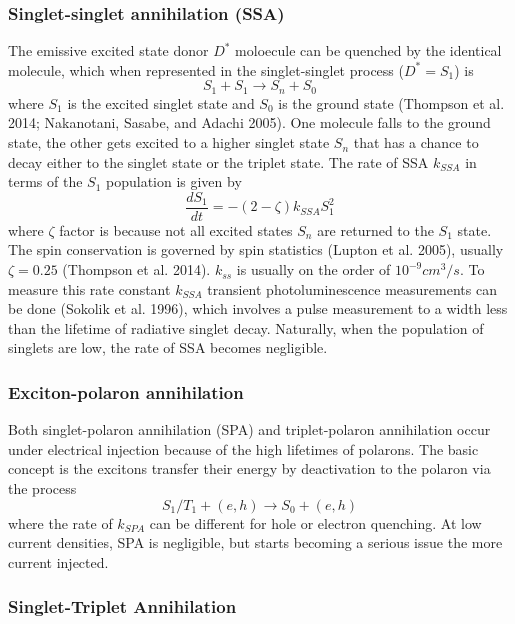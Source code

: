 \documentclass[
  letterpaper,
  DIV=11,
  numbers=noendperiod,
  oneside]{scrreprt}
\begin{document}
\hypertarget{singlet-singlet-annihilation-ssa}{%
\subsubsection{Singlet-singlet annihilation
(SSA)}\label{singlet-singlet-annihilation-ssa}}

The emissive excited state donor \(D^*\) moloecule can be quenched by
the identical molecule, which when represented in the singlet-singlet
process (\(D^*=S_1\)) is \[S_1 + S_1 \rightarrow S_n + S_0\] where
\(S_1\) is the excited singlet state and \(S_0\) is the ground state
(Thompson et al. 2014; Nakanotani, Sasabe, and Adachi 2005). One
molecule falls to the ground state, the other gets excited to a higher
singlet state \(S_n\) that has a chance to decay either to the singlet
state or the triplet state. The rate of SSA \(k_{SSA}\) in terms of the
\(S_1\) population is given by
\[\frac{dS_1}{dt} = -(2-\zeta)k_{SSA}S_1^2\] where \(\zeta\) factor is
because not all excited states \(S_n\) are returned to the \(S_1\)
state. The spin conservation is governed by spin statistics (Lupton et
al. 2005), usually \(\zeta=0.25\) (Thompson et al. 2014). \(k_{ss}\) is
usually on the order of \(10^{-9} cm^3/s\). To measure this rate
constant \(k_{SSA}\) transient photoluminescence measurements can be
done (Sokolik et al. 1996), which involves a pulse measurement to a
width less than the lifetime of radiative singlet decay. Naturally, when
the population of singlets are low, the rate of SSA becomes negligible.

\hypertarget{exciton-polaron-annihilation}{%
\subsubsection{Exciton-polaron
annihilation}\label{exciton-polaron-annihilation}}

Both singlet-polaron annihilation (SPA) and triplet-polaron annihilation
occur under electrical injection because of the high lifetimes of
polarons. The basic concept is the excitons transfer their energy by
deactivation to the polaron via the process
\[S_1 / T_1 + (e,h) \rightarrow S_0 + (e,h)\] where the rate of
\(k_{SPA}\) can be different for hole or electron quenching. At low
current densities, SPA is negligible, but starts becoming a serious
issue the more current injected.

\hypertarget{singlet-triplet-annihilation}{%
\subsubsection{Singlet-Triplet
Annihilation}\label{singlet-triplet-annihilation}}
\end{document}
